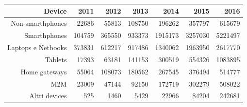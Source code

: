 \documentclass[convert={density=300,size=1080x800,outext=.png}]{standalone}
\begin{document}
\begin{tabular}{rrrrrrr}
\hline
        Device & 2011 & 2012 & 2013 & 2014 & 2015 & 2016 \\
        \hline
        Non-smarthphones & 22686 & 55813 & 108750 & 196262 & 357797 & 615679 \\
        Smarthphones & 104759 & 365550 & 933373 & 1915173 & 3257030 & 5221497 \\
        Laptops e Netbooks & 373831 & 612217 & 917486 & 1340062 & 1963950 & 2617770\\
        Tablets & 17393 & 63181 & 141153 & 300519 & 554326 & 1083895\\
        Home gateways & 55064 & 108073 & 180562 & 267545 & 376494 & 514777 \\
        M2M & 23009 & 47144 & 92150 & 172719 & 302279 & 508022 \\
        Altri devices & 525 & 1460 & 5429 & 22966 & 84204 & 242681\\
        \hline
\end{tabular}
\end{document}
